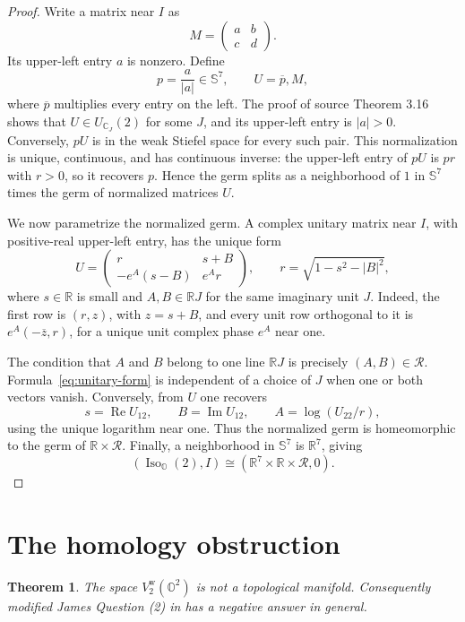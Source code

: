 \documentclass[11pt]{article}
\newtheorem{theorem}{Theorem}
\newcommand{\R}{\mathbb R}
\renewcommand{\O}{\mathbb O}
\newcommand{\Sph}{\mathbb S}
\newcommand{\cR}{\mathcal R}
\newcommand{\Iso}{\operatorname{Iso}}
\begin{document}
\begin{proof}
Write a matrix near \(I\) as
\[
 M=\begin{pmatrix}a&b\\c&d\end{pmatrix}.
\]
Its upper-left entry \(a\) is nonzero. Define
\[
 p=\frac a{|a|}\in\Sph^7,
 \qquad U=\overline p,M,
\]
where \(\overline p\) multiplies every entry on the left. The proof of source
Theorem 3.16 shows that \(U\in U_{\mathbb C_J}(2)\) for some \(J\), and its
upper-left entry is \(|a|>0\). Conversely, \(pU\) is in the weak Stiefel
space for every such pair. This normalization is unique, continuous, and has
continuous inverse: the upper-left entry of \(pU\) is \(p r\) with
\(r>0\), so it recovers \(p\). Hence the germ splits as a neighborhood of
\(1\) in \(\Sph^7\) times the germ of normalized matrices \(U\).

We now parametrize the normalized germ. A complex unitary matrix near
\(I\), with positive-real upper-left entry, has the unique form
\begin{equation}\label{eq:unitary-form}
 U=
 \begin{pmatrix}
  r&s+B\\
  -e^A(s-B)&e^A r
 \end{pmatrix},
 \qquad
 r=\sqrt{1-s^2-|B|^2},
\end{equation}
where \(s\in\R\) is small and \(A,B\in\R J\) for the same imaginary unit
\(J\). Indeed, the first row is \((r,z)\), with \(z=s+B\), and every unit
row orthogonal to it is
\(e^A(-\overline z,r)\), for a unique unit complex phase \(e^A\) near one.

The condition that \(A\) and \(B\) belong to one line \(\R J\) is precisely
\((A,B)\in\cR\). Formula~\eqref{eq:unitary-form} is independent of a choice
of \(J\) when one or both vectors vanish. Conversely, from \(U\) one
recovers
\[
 s=\operatorname{Re}U_{12},\qquad
 B=\operatorname{Im}U_{12},\qquad
 A=\log(U_{22}/r),
\]
using the unique logarithm near one. Thus the normalized germ is
homeomorphic to the germ of \(\R\times\cR\). Finally, a neighborhood in
\(\Sph^7\) is \(\R^7\), giving
\[
 (\Iso_{\O}(2),I)\cong(\R^7\times\R\times\cR,0).
\]
\end{proof}

\section{The homology obstruction}

\begin{theorem}\label{thm:not-manifold}
The space \(V^{\mathrm w}_2(\O^2)\) is not a topological manifold.
Consequently modified James Question (2) in \cite{source} has a negative
answer in general.
\end{theorem}
\end{document}
